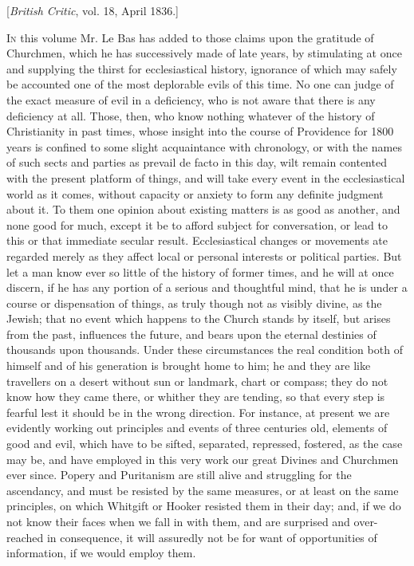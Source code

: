 
[\emph{British
Critic}, vol. 18, April 1836.]

I\textsc{n} this volume Mr. Le
Bas has added to those claims upon the gratitude of Churchmen, which he
has successively made of late years, by stimulating at once and
supplying the thirst for ecclesiastical history, ignorance of which may
safely be accounted one of the most deplorable evils of this time. No
one can judge of the exact measure of evil in a deficiency, who is not
aware that there is any deficiency at all. Those, then, who know nothing
whatever of the history of Christianity in past times, whose insight
into the course of Providence for 1800 years is confined to some slight
acquaintance with chronology, or with the names of such sects and
parties as prevail de facto in this day, wilt remain contented with the
present platform of things, and will take every event in the
ecclesiastical world as it comes, without capacity or anxiety to form
any definite judgment about it. To them one opinion about existing
matters is as good as another, and none good for much, except it be to
afford subject for conversation, or lead to this or that immediate
secular result. Ecclesiastical changes or movements ate regarded merely
as they affect local or personal interests or political parties. But let
a man know ever so little of the history of former times, and he
will at once discern, if he has any portion of a serious and thoughtful
mind, that he is under a course or dispensation of things, as truly
though not as visibly divine, as the Jewish; that no event which happens
to the Church stands by itself, but arises from the past, influences the
future, and bears upon the eternal destinies of thousands upon
thousands. Under these circumstances the real condition both of himself
and of his generation is brought home to him; he and they are like
travellers on a desert without sun or landmark, chart or compass; they
do not know how they came there, or whither they are tending, so that
every step is fearful lest it should be in the wrong direction. For
instance, at present we are evidently working out principles and events
of three centuries old, elements of good and evil, which have to be
sifted, separated, repressed, fostered, as the case may be, and have
employed in this very work our great Divines and Churchmen ever since.
Popery and Puritanism are still alive and struggling for the ascendancy,
and must be resisted by the same measures, or at least on the same
principles, on which Whitgift or Hooker resisted them in their day; and,
if we do not know their faces when we fall in with them, and are
surprised and over-reached in consequence, it will assuredly not be for
want of opportunities of information, if we would employ them.

